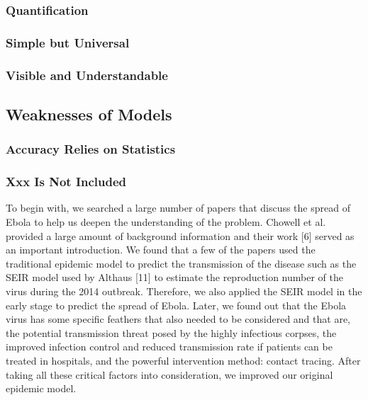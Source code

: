 \documentclass{mcmthesis}
\begin{document}
\subsubsection{Quantification}
\subsubsection{Simple but Universal}
\subsubsection{Visible and Understandable}
\subsection{Weaknesses of Models}
\subsubsection{Accuracy Relies on Statistics}
\subsubsection{Xxx Is Not Included}

To begin with, we searched a large number of papers that discuss the spread of
Ebola to help us deepen the understanding of the problem. Chowell et al. provided a
large amount of background information and their work [6] served as an important
introduction. We found that a few of the papers used the traditional epidemic model to
predict the transmission of the disease such as the SEIR model used by Althaus [11] to
estimate the reproduction number of the virus\cite{bib1,bib2} during the 2014 outbreak. Therefore, we
also applied the SEIR model in the early stage to predict the spread of Ebola. Later, we
found out that the Ebola virus has some specific feathers that also needed to be
considered and that are, the potential transmission threat posed by the highly infectious
corpses, the improved infection control and reduced transmission rate if patients can be
treated in hospitals, and the powerful intervention method: contact tracing. After taking
all these critical factors into consideration, we improved our original epidemic model.
\end{document}
